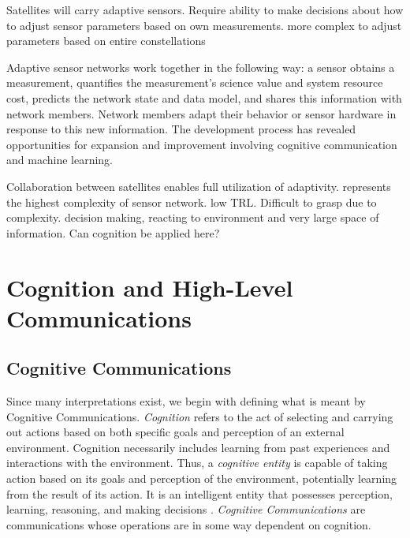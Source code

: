 \documentclass[conference]{IEEEtran}
\begin{document}
{ \color{red} Satellites will carry adaptive sensors.  Require ability to make decisions about how to adjust sensor parameters based on own measurements.  more complex to adjust parameters based on entire constellations}

Adaptive sensor networks work together in the following way: a sensor obtains a measurement, quantifies the measurement's science value and system resource cost, predicts the network state and data model, and shares this information with network members.  Network members adapt their behavior or sensor hardware in response to this new information.  The development process has revealed opportunities for expansion and improvement involving cognitive communication and machine learning.

{ \color{red} Collaboration between satellites enables full utilization of adaptivity.  represents the highest complexity of sensor network.  low TRL.  Difficult to grasp due to complexity.  decision making, reacting to environment and very large space of information.  Can cognition be applied here? }

\vfill


\section{Cognition and High-Level Communications} \label{sec:hlc}

\subsection{Cognitive Communications}
\label{ssec:cognit}

Since many interpretations exist, we begin with defining what is meant by Cognitive Communications.  \textit{Cognition} refers to the act of selecting and carrying out actions based on both specific goals and perception of an external environment.  Cognition necessarily includes learning from past experiences and interactions with the environment.  Thus, a \textit{cognitive entity} is capable of taking action based on its goals and perception of the environment, potentially learning from the result of its action.  It is an intelligent entity that possesses perception, learning, reasoning, and making decisions \cite{ref7}. \textit{Cognitive Communications} are communications whose operations are in some way dependent on cognition.
\end{document}
